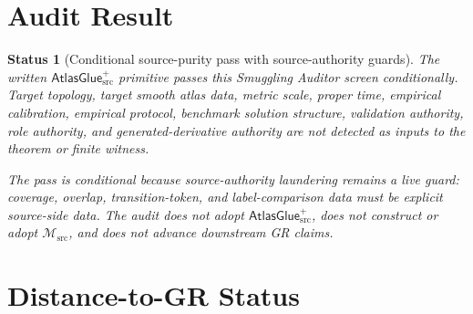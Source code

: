 \documentclass[11pt]{article}
\newcommand{\Msrc}{\mathcal{M}_{\mathrm{src}}}
\newcommand{\AtlasGlue}{\mathsf{AtlasGlue}_{\mathrm{src}}^{+}}
\newtheorem{status}{Status}
\begin{document}
\section{Audit Result}

\begin{status}[Conditional source-purity pass with source-authority guards]
The written \(\AtlasGlue\) primitive passes this Smuggling Auditor screen
conditionally. Target topology, target smooth atlas data, metric scale, proper
time, empirical calibration, empirical protocol, benchmark solution
structure, validation authority, role authority, and generated-derivative
authority are not detected as inputs to the theorem or finite witness.

The pass is conditional because source-authority laundering remains a live
guard: coverage, overlap, transition-token, and label-comparison data must be
explicit source-side data. The audit does not adopt \(\AtlasGlue\), does not
construct or adopt \(\Msrc\), and does not advance downstream GR claims.
\end{status}

\section{Distance-to-GR Status}
\end{document}
